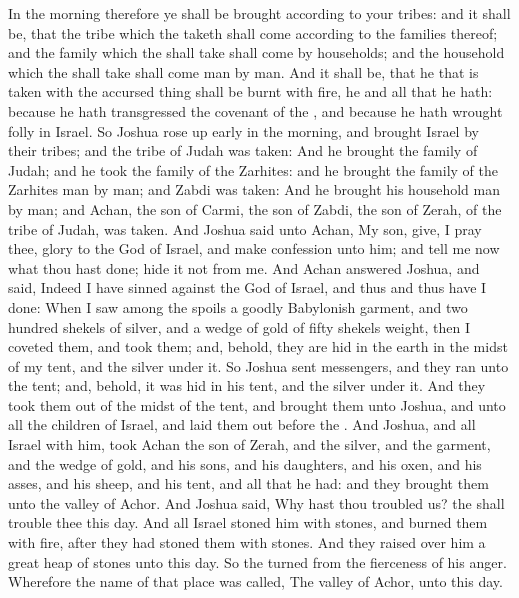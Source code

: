 \begin{biblechapter}
\verse In the morning therefore ye shall be brought according to your tribes: and it shall be, that the tribe which the \LORD taketh shall come according to the families thereof; and the family which the \LORD shall take shall come by households; and the household which the \LORD shall take shall come man by man.
\verse And it shall be, that he that is taken with the accursed thing shall be burnt with fire, he and all that he hath: because he hath transgressed the covenant of the \LORD, and because he hath wrought folly in Israel.
\verse So Joshua rose up early in the morning, and brought Israel by their tribes; and the tribe of Judah was taken:
\verse And he brought the family of Judah; and he took the family of the Zarhites: and he brought the family of the Zarhites man by man; and Zabdi was taken:
\verse And he brought his household man by man; and Achan, the son of Carmi, the son of Zabdi, the son of Zerah, of the tribe of Judah, was taken.
\verse And Joshua said unto Achan, My son, give, I pray thee, glory to the \LORD God of Israel, and make confession unto him; and tell me now what thou hast done; hide it not from me.
\verse And Achan answered Joshua, and said, Indeed I have sinned against the \LORD God of Israel, and thus and thus have I done:
\verse When I saw among the spoils a goodly Babylonish garment, and two hundred shekels of silver, and a wedge of gold of fifty shekels weight, then I coveted them, and took them; and, behold, they are hid in the earth in the midst of my tent, and the silver under it.
\verse So Joshua sent messengers, and they ran unto the tent; and, behold, it was hid in his tent, and the silver under it.
\verse And they took them out of the midst of the tent, and brought them unto Joshua, and unto all the children of Israel, and laid them out before the \LORD.
\verse And Joshua, and all Israel with him, took Achan the son of Zerah, and the silver, and the garment, and the wedge of gold, and his sons, and his daughters, and his oxen, and his asses, and his sheep, and his tent, and all that he had: and they brought them unto the valley of Achor.
\verse And Joshua said, Why hast thou troubled us? the \LORD shall trouble thee this day. And all Israel stoned him with stones, and burned them with fire, after they had stoned them with stones.
\verse And they raised over him a great heap of stones unto this day. So the \LORD turned from the fierceness of his anger. Wherefore the name of that place was called, The valley of Achor, unto this day.
\end{biblechapter}


